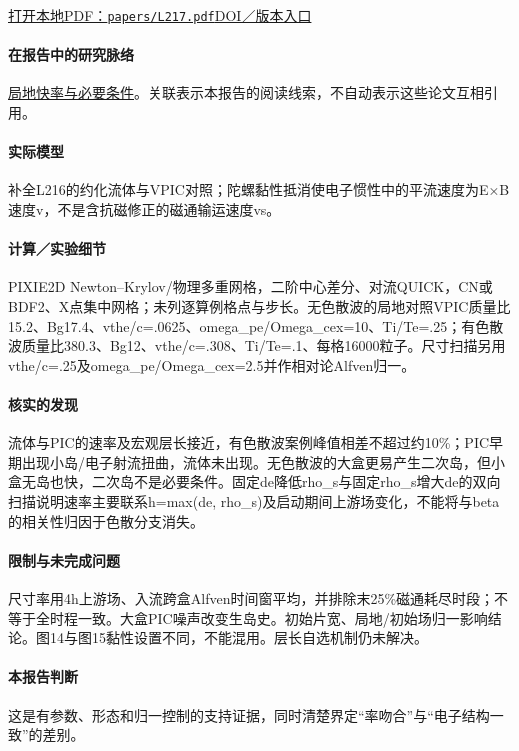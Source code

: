 \href{run:papers/L217.pdf}{打开本地PDF：\texttt{papers/L217.pdf}}\quad\href{https://doi.org/10.1063/1.4932330}{DOI／版本入口}

\paragraph{在报告中的研究脉络}\hyperref[story:fast]{局地快率与必要条件}。关联表示本报告的阅读线索，不自动表示这些论文互相引用。

\paragraph{实际模型}补全L216的约化流体与VPIC对照；陀螺黏性抵消使电子惯性中的平流速度为E×B速度v，不是含抗磁修正的磁通输运速度vs。

\paragraph{计算／实验细节}PIXIE2D Newton–Krylov/物理多重网格，二阶中心差分、对流QUICK，CN或BDF2、X点集中网格；未列逐算例格点与步长。无色散波的局地对照VPIC质量比15.2、Bg17.4、vthe/c=.0625、omega\_pe/Omega\_cex=10、Ti/Te=.25；有色散波质量比380.3、Bg12、vthe/c=.308、Ti/Te=.1、每格16000粒子。尺寸扫描另用vthe/c=.25及omega\_pe/Omega\_cex=2.5并作相对论Alfven归一。

\paragraph{核实的发现}流体与PIC的速率及宏观层长接近，有色散波案例峰值相差不超过约10\%；PIC早期出现小岛/电子射流扭曲，流体未出现。无色散波的大盒更易产生二次岛，但小盒无岛也快，二次岛不是必要条件。固定de降低rho\_s与固定rho\_s增大de的双向扫描说明速率主要联系h=max(de, rho\_s)及启动期间上游场变化，不能将与beta的相关性归因于色散分支消失。

\paragraph{限制与未完成问题}尺寸率用4h上游场、入流跨盒Alfven时间窗平均，并排除末25\%磁通耗尽时段；不等于全时程一致。大盒PIC噪声改变生岛史。初始片宽、局地/初始场归一影响结论。图14与图15黏性设置不同，不能混用。层长自选机制仍未解决。

\paragraph{本报告判断}这是有参数、形态和归一控制的支持证据，同时清楚界定“率吻合”与“电子结构一致”的差别。

